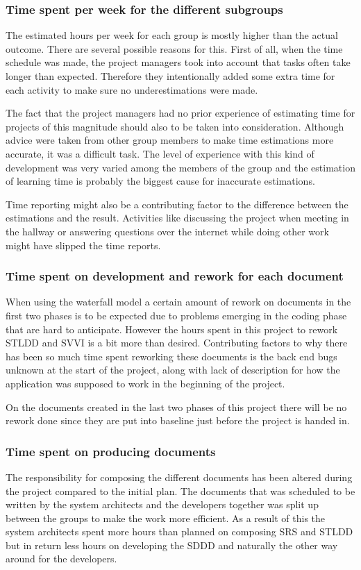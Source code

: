\documentclass[a4paper]{article}
\begin{document}
\subsubsection{Time spent per week for the different subgroups}
The estimated hours per week for each group is mostly higher than the actual outcome. There are several possible reasons for this. First of all, when the time schedule was made, the project managers took into account that tasks often take longer than expected. Therefore they intentionally added some extra time for each activity to make sure no underestimations were made. 

The fact that the project managers had no prior experience of estimating time for projects of this magnitude should also to be taken into consideration. Although advice were taken from other group members to make time estimations more accurate, it was a difficult task. The level of experience with this kind of development was very varied among the members of the group and the estimation of learning time is probably the biggest cause for inaccurate estimations.

Time reporting might also be a contributing factor to the difference between the estimations and the result. Activities like discussing the project when meeting in the hallway or answering questions over the internet while doing other work might have slipped the time reports. 


\subsubsection{Time spent on development and rework for each document} 
When using the waterfall model a certain amount of rework on documents in the first two phases is to be expected due to problems emerging in the coding phase that are hard to anticipate. However the hours spent in this project to rework STLDD and  SVVI is a bit more than desired. Contributing factors to why there has been so much time spent reworking these documents is the back end bugs unknown at the start of the project, along with lack of description for how the application was supposed to work in the beginning of the project.

On the documents created in the last two phases of this project there will be no rework done since they are put into baseline just before the project is handed in. 


\subsubsection{Time spent on producing documents}
The responsibility for composing the different documents has been altered during the project compared to the initial plan. 
The documents that was scheduled to be written by the system architects and the developers together was split up between the groups to make the work more efficient. As a result of this the system architects spent more hours than planned on composing SRS and STLDD but in return less hours on developing the SDDD and naturally the other way around for the developers. 
\end{document}
